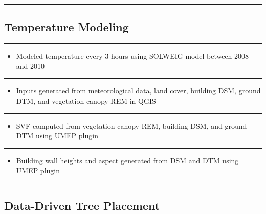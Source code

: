 \documentclass[
  letterpaper,
  DIV=11,
  numbers=noendperiod]{scrreprt}
\providecommand{\tightlist}{%
  \setlength{\itemsep}{0pt}\setlength{\parskip}{0pt}}\usepackage{longtable,booktabs,array}
\begin{document}
\begin{center}\rule{0.5\linewidth}{0.5pt}\end{center}

\hypertarget{temperature-modeling}{%
\subsection{Temperature Modeling}\label{temperature-modeling}}

\begin{center}\rule{0.5\linewidth}{0.5pt}\end{center}

\begin{itemize}
\tightlist
\item
  Modeled temperature every 3 hours using SOLWEIG model between 2008 and
  2010
\end{itemize}

\begin{center}\rule{0.5\linewidth}{0.5pt}\end{center}

\begin{itemize}
\tightlist
\item
  Inputs generated from meteorological data, land cover, building DSM,
  ground DTM, and vegetation canopy REM in QGIS
\end{itemize}

\begin{center}\rule{0.5\linewidth}{0.5pt}\end{center}

\begin{itemize}
\tightlist
\item
  SVF computed from vegetation canopy REM, building DSM, and ground DTM
  using UMEP plugin
\end{itemize}

\begin{center}\rule{0.5\linewidth}{0.5pt}\end{center}

\begin{itemize}
\tightlist
\item
  Building wall heights and aspect generated from DSM and DTM using UMEP
  plugin
\end{itemize}

\begin{center}\rule{0.5\linewidth}{0.5pt}\end{center}

\hypertarget{data-driven-tree-placement}{%
\subsection{Data-Driven Tree
Placement}\label{data-driven-tree-placement}}
\end{document}
